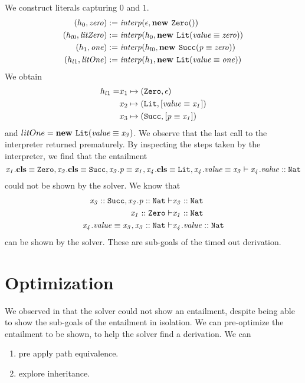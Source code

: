 We construct literals capturing $0$ and $1$.
\begin{align*}
  (h_0, \mathit{zero}) &:= \mathit{interp}(\epsilon, \textbf{new } \mathit{\texttt{Zero}}())\\
  (h_{l0}, \mathit{litZero}) &:= \mathit{interp}(h_0, \textbf{new } \mathit{\texttt{Lit}}(\mathit{\mathit{value}} \equiv \mathit{\mathit{zero}}))\\
  (h_1, \mathit{one}) &:= \mathit{interp}(h_{l0}, \textbf{new } \mathit{\texttt{Succ}}(\mathit{p} \equiv \mathit{\mathit{zero}}))\\
  (h_{l1}, \mathit{litOne}) &:= \mathit{interp}(h_1, \textbf{new } \mathit{\texttt{Lit}}(\mathit{\mathit{value}} \equiv \mathit{\mathit{one}}))
\end{align*}
We obtain
\begin{align*}
h_{l1} = &x_1 \mapsto (\texttt{Zero}, \epsilon)\\
         &x_2 \mapsto (\texttt{Lit}, [\mathit{\mathit{value}} \equiv \mathit{x_1}])\\
         &x_3 \mapsto (\texttt{Succ}, [\mathit{\mathit{p}} \equiv \mathit{x_1}])
\end{align*}
and $litOne = \textbf{new } \mathit{\texttt{Lit}}(\mathit{\mathit{value}} \equiv \mathit{\mathit{x_3}})$.
We observe that the last call to the interpreter
returned prematurely.
By inspecting the steps taken by the interpreter, we find that
the entailment
\[
  \entails{
            \instBy{x_1}{\texttt{Zero}},
            \instBy{x_3}{\texttt{Succ}},
            \pathEq{x_3.p}{x_1},
            \instBy{x_4}{\texttt{Lit}},
            \pathEq{x_4.value}{x_3}
          }
          {\instOf{x_4.value}{\texttt{Nat}}}
\]
could not be shown by the solver.
We know that
\begin{align*}
\entails
  {
    \instOf{x_3}{\texttt{Succ}},
    \instOf{x_3.p}{\texttt{Nat}}
  }
  {&\instOf{x_3}{\texttt{Nat}}}\\
\entails
  {\instOf{x_1}{\texttt{Zero}}}
  {&\instOf{x_1}{\texttt{Nat}}}\\
\entails
  {\pathEq{x_4.value}{x_3},
   \instOf{x_3}{\texttt{Nat}}}
  {&\instOf{x_4.value}{\texttt{Nat}}}
\end{align*}
can be shown by the solver.
These are sub-goals of the timed out derivation.

\section{Optimization}
\label{sec:runtime-optimization}
We observed in 
that the solver could not show an entailment,
despite being able to show the sub-goals of the entailment
in isolation.
We can pre-optimize the entailment to be shown,
to help the solver find a derivation.
We can
\begin{enumerate}
  \item pre apply path equivalence.
  \item explore inheritance.
\end{enumerate}

